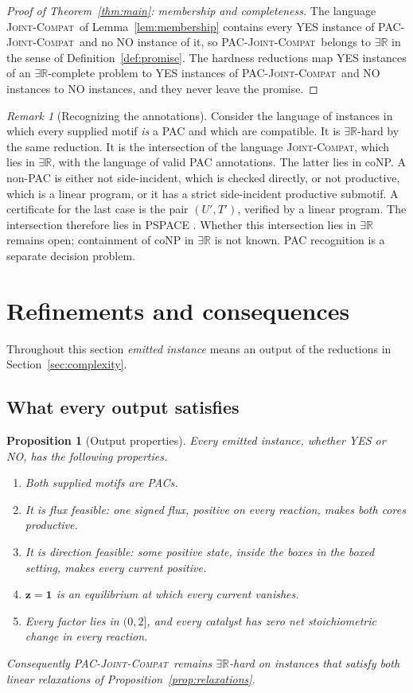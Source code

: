\documentclass[11pt,a4paper]{article}
\theoremstyle{plain}
\newtheorem{proposition}[theorem]{Proposition}
\theoremstyle{definition}
\theoremstyle{remark}
\newtheorem{remark}[theorem]{Remark}
\newcommand{\ER}{\exists\mathbb{R}}
\newcommand{\act}{\boldsymbol z}
\newcommand{\one}{\mathbf 1}
\newcommand{\JC}{\textup{\textsc{Joint-Compat}}}
\newcommand{\PJC}{\textup{\textsc{PAC-Joint-Compat}}}
\begin{document}
\begin{proof}[Proof of Theorem~\ref{thm:main}: membership and completeness]
The language \JC\ of Lemma~\ref{lem:membership} contains every YES instance of \PJC\ and no NO instance of it, so \PJC\ belongs to $\ER$ in the sense of Definition~\ref{def:promise}. The hardness reductions map YES instances of an $\ER$-complete problem to YES instances of \PJC\ and NO instances to NO instances, and they never leave the promise.
\end{proof}

\begin{remark}[Recognizing the annotations]\label{rem:recognition}
Consider the language of instances in which every supplied motif \emph{is} a PAC and which are compatible. It is $\ER$-hard by the same reduction. It is the intersection of the language \JC, which lies in $\ER$, with the language of valid PAC annotations. The latter lies in coNP. A non-PAC is either not side-incident, which is checked directly, or not productive, which is a linear program, or it has a strict side-incident productive submotif. A certificate for the last case is the pair $(U',T')$, verified by a linear program. The intersection therefore lies in PSPACE \citep{canny1988}. Whether this intersection lies in $\ER$ remains open; containment of coNP in $\ER$ is not known. PAC recognition is a separate decision problem.
\end{remark}

\section{Refinements and consequences}\label{sec:consequences}

Throughout this section \emph{emitted instance} means an output of the reductions in Section~\ref{sec:complexity}.

\subsection{What every output satisfies}

\begin{proposition}[Output properties]\label{prop:outputs}
Every emitted instance, whether YES or NO, has the following properties.
\begin{enumerate}[label=\textup{(\alph*)}]
\item Both supplied motifs are PACs.
\item It is flux feasible: one signed flux, positive on every reaction, makes both cores productive.
\item It is direction feasible: some positive state, inside the boxes in the boxed setting, makes every current positive.
\item $\act=\one$ is an equilibrium at which every current vanishes.
\item Every factor lies in $(0,2]$, and every catalyst has zero net stoichiometric change in every reaction.
\end{enumerate}
Consequently \PJC\ remains $\ER$-hard on instances that satisfy both linear relaxations of Proposition~\ref{prop:relaxations}.
\end{proposition}
\end{document}
